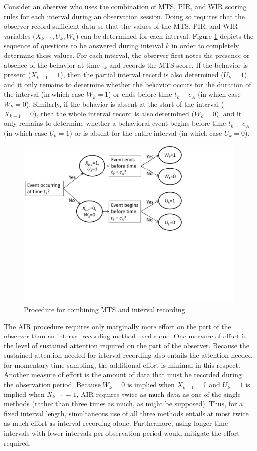 \documentclass[man, noextraspace, floatsintext]{apa6}\usepackage[]{graphicx}\usepackage[]{color}
\begin{document}
Consider an observer who uses the combination of MTS, PIR, and WIR scoring rules for each interval during an observation session. 
Doing so requires that the observer record sufficient data so that the values of the MTS, PIR, and WIR variables ($X_{k-1},U_k,W_k$) can be determined for each interval. 
Figure \ref{fig:questions} depicts the sequence of questions to be answered during interval $k$ in order to completely determine these values. 
For each interval, the observer first notes the presence or absence of the behavior at time $t_k$ and records the MTS score. 
If the behavior is present ($X_{k-1} = 1$), then the partial interval record is also determined ($U_k = 1$), and it only remains to determine whether the behavior occurs for the duration of the interval (in which case $W_k = 1$) or ends before time $t_k + c_A$ (in which case $W_k = 0$). 
Similarly, if the behavior is absent at the start of the interval ($X_{k-1} = 0$), then the whole interval record is also determined ($W_k = 0$), and it only remains to determine whether a behavioral event begins before time $t_k + c_A$ (in which case $U_k = 1$) or is absent for the entire interval (in which case $U_k = 0$). 

\begin{figure}[hbtp]
\centering
\includegraphics[clip=true, trim= 0 240 150 00, width=0.8\linewidth]{AIR_flowchart.pdf}
\caption{Procedure for combining MTS and interval recording}
\label{fig:questions}
\end{figure}  

The AIR procedure requires only marginally more effort on the part of the observer than an interval recording method used alone. 
One measure of effort is the level of sustained attention required on the part of the observer. Because the sustained attention needed for interval recording also entails the attention needed for momentary time sampling, the additional effort is minimal in this respect.
Another measure of effort is the amount of data that must be recorded during the observation period. Because $W_k = 0$ is implied when $X_{k-1} = 0$ and $U_k = 1$ is implied when $X_{k-1} = 1$, AIR requires twice as much data as one of the single methods (rather than three times as much, as might be supposed). 
Thus, for a fixed interval length, simultaneous use of all three methods entails at most twice as much effort as interval recording alone. 
Furthermore, using longer time-intervals with fewer intervals per observation period would mitigate the effort required. 
\end{document}
